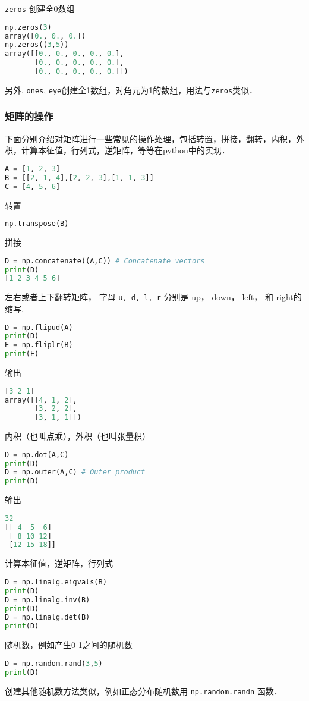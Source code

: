 \verb|zeros| 创建全0数组
\begin{lstlisting}[language=python]
np.zeros(3)
array([0., 0., 0.])
np.zeros((3,5))
array([[0., 0., 0., 0., 0.],
       [0., 0., 0., 0., 0.],
       [0., 0., 0., 0., 0.]])
\end{lstlisting} 
另外, \verb|ones|, \verb|eye|创建全1数组，对角元为1的数组，用法与\verb|zeros|类似．


\subsubsection{矩阵的操作}
下面分别介绍对矩阵进行一些常见的操作处理，包括转置，拼接，翻转，内积，外积，计算本征值，行列式，逆矩阵，等等在python中的实现．
\begin{lstlisting}[language=python]
A = [1, 2, 3]
B = [[2, 1, 4],[2, 2, 3],[1, 1, 3]]
C = [4, 5, 6]
\end{lstlisting}
转置
\begin{lstlisting}[language=python]
np.transpose(B)
\end{lstlisting}
拼接
\begin{lstlisting}[language=python]
D = np.concatenate((A,C)) # Concatenate vectors
print(D)
[1 2 3 4 5 6]
\end{lstlisting}
左右或者上下翻转矩阵， 字母 \verb|u, d, l, r| 分别是 up， down，  left， 和  right的缩写.
\begin{lstlisting}[language=python]
D = np.flipud(A) 
print(D)
E = np.fliplr(B) 
print(E)
\end{lstlisting}
输出
\begin{lstlisting}[language=python]
[3 2 1]
array([[4, 1, 2],
       [3, 2, 2],
       [3, 1, 1]])
\end{lstlisting}
内积（也叫点乘），外积（也叫张量积）
\begin{lstlisting}[language=python]
D = np.dot(A,C) 
print(D)
D = np.outer(A,C) # Outer product
print(D)
\end{lstlisting}
输出
\begin{lstlisting}[language=python]
32
[[ 4  5  6]
 [ 8 10 12]
 [12 15 18]]
\end{lstlisting}
计算本征值，逆矩阵，行列式
\begin{lstlisting}[language=python]
D = np.linalg.eigvals(B) 
print(D)
D = np.linalg.inv(B)
print(D)
D = np.linalg.det(B)
print(D)
\end{lstlisting}
随机数，例如产生0-1之间的随机数
\begin{lstlisting}[language=python]
D = np.random.rand(3,5) 
print(D)
\end{lstlisting}
创建其他随机数方法类似，例如正态分布随机数用 \verb|np.random.randn| 函数．




